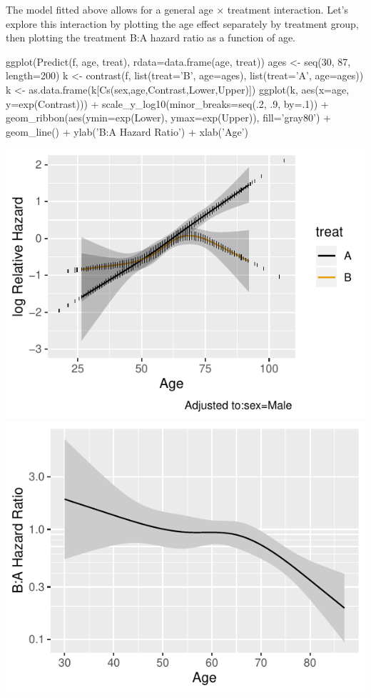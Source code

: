 The model fitted above allows for a general age $\times$ treatment interaction.  Let's explore this interaction by plotting the age effect separately by treatment group, then plotting the treatment B:A hazard ratio as a function of age.
\begin{Schunk}
\begin{Sinput}
ggplot(Predict(f, age, treat), rdata=data.frame(age, treat))
ages <- seq(30, 87, length=200)
k <- contrast(f, list(treat='B', age=ages), list(treat='A', age=ages))
k <- as.data.frame(k[Cs(sex,age,Contrast,Lower,Upper)])
ggplot(k, aes(x=age, y=exp(Contrast))) +
  scale_y_log10(minor_breaks=seq(.2, .9, by=.1)) + 
  geom_ribbon(aes(ymin=exp(Lower), ymax=exp(Upper)), fill='gray80') +
  geom_line() +
  ylab('B:A Hazard Ratio') + xlab('Age')
\end{Sinput}


\centerline{\includegraphics[width=\maxwidth]{ancova-hteplot-1} \includegraphics[width=\maxwidth]{ancova-hteplot-2} }

\end{Schunk}

